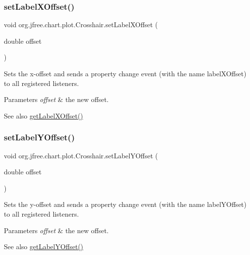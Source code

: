 \subsubsection{\texorpdfstring{set\+Label\+X\+Offset()}{setLabelXOffset()}}
{\footnotesize\ttfamily void org.\+jfree.\+chart.\+plot.\+Crosshair.\+set\+Label\+X\+Offset (\begin{DoxyParamCaption}\item[{double}]{offset }\end{DoxyParamCaption})}

Sets the x-\/offset and sends a property change event (with the name \textquotesingle{}label\+X\+Offset\textquotesingle{}) to all registered listeners.


\begin{DoxyParams}{Parameters}
{\em offset} & the new offset.\\
\hline
\end{DoxyParams}
\begin{DoxySeeAlso}{See also}
\mbox{\hyperlink{classorg_1_1jfree_1_1chart_1_1plot_1_1_crosshair_a3702761bf1f6394f61e44f3763d3e63a}{get\+Label\+X\+Offset()}} 
\end{DoxySeeAlso}
\mbox{\label{classorg_1_1jfree_1_1chart_1_1plot_1_1_crosshair_a0eeeea778eddf6aca775cb191555f67b}} 
\subsubsection{\texorpdfstring{set\+Label\+Y\+Offset()}{setLabelYOffset()}}
{\footnotesize\ttfamily void org.\+jfree.\+chart.\+plot.\+Crosshair.\+set\+Label\+Y\+Offset (\begin{DoxyParamCaption}\item[{double}]{offset }\end{DoxyParamCaption})}

Sets the y-\/offset and sends a property change event (with the name \textquotesingle{}label\+Y\+Offset\textquotesingle{}) to all registered listeners.


\begin{DoxyParams}{Parameters}
{\em offset} & the new offset.\\
\hline
\end{DoxyParams}
\begin{DoxySeeAlso}{See also}
\mbox{\hyperlink{classorg_1_1jfree_1_1chart_1_1plot_1_1_crosshair_a83c5071b95c67fc816c44dff9749d636}{get\+Label\+Y\+Offset()}} 
\end{DoxySeeAlso}
\mbox{\label{classorg_1_1jfree_1_1chart_1_1plot_1_1_crosshair_a941b74a54828b6864ffd2557fcdc9ecd}} 
